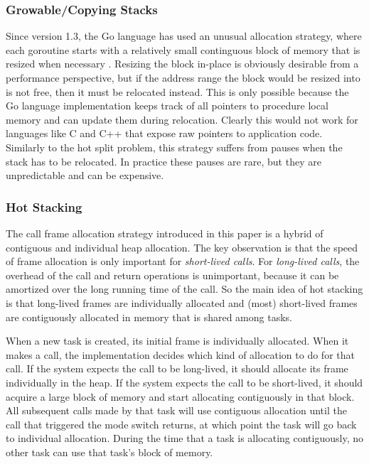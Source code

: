 \documentclass[acmsmall,anonymous,review]{acmart}\settopmatter{printfolios=true,printccs=false,printacmref=false}
\begin{document}

\subsubsection{Growable/Copying Stacks}

Since version 1.3, the Go language has used an unusual allocation strategy, where each goroutine starts with a relatively small continguous block of memory that is resized when necessary \cite{Cheney2014, Morsing2014}.
Resizing the block in-place is obviously desirable from a performance perspective, but if the address range the block would be resized into is not free, then it must be relocated instead.
This is only possible because the Go language implementation keeps track of all pointers to procedure local memory and can update them during relocation.
Clearly this would not work for languages like C and C++ that expose raw pointers to application code.
Similarly to the hot split problem, this strategy suffers from pauses when the stack has to be relocated.
In practice these pauses are rare, but they are unpredictable and can be expensive.

\subsubsection{Hot Stacking}

The call frame allocation strategy introduced in this paper is a hybrid of contiguous and individual heap allocation.
The key observation is that the speed of frame allocation is only important for \emph{short-lived calls}.
For \emph{long-lived calls}, the overhead of the call and return operations is unimportant, because it can be amortized over the long running time of the call.
So the main idea of hot stacking is that long-lived frames are individually allocated and (most) short-lived frames are contiguously allocated in memory that is shared among tasks.

When a new task is created, its initial frame is individually allocated.
When it makes a call, the implementation decides which kind of allocation to do for that call.
If the system expects the call to be long-lived, it should allocate its frame individually in the heap.
If the system expects the call to be short-lived, it should acquire a large block of memory and start allocating contiguously in that block.
All subsequent calls made by that task will use contiguous allocation until the call that triggered the mode switch returns, at which point the task will go back to individual allocation.
During the time that a task is allocating contiguously, no other task can use that task's block of memory.
\end{document}
